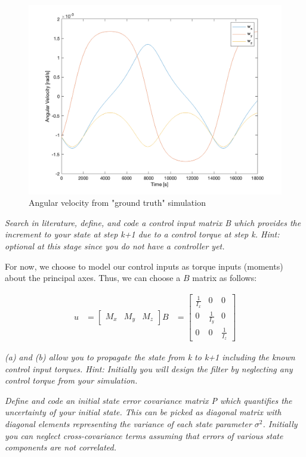 \begin{figure}[H]
\centering
\includegraphics[scale=0.6]{Images/ps7_problem5a_angvel_sim.png}
\caption{Angular velocity from "ground truth" simulation}
\label{fig:ps7_problem5a_angvel_sim}
\end{figure}

\textit{Search in literature, define, and code a control input matrix B which provides the increment to your state at step k+1 due to a control torque at step k. Hint: optional at this stage since you do not have a controller yet.}

For now, we choose to model our control inputs as torque inputs (moments) about the principal axes. Thus, we can choose a $B$ matrix as follows:

\begin{align*}
    u &= \begin{bmatrix}
        M_{x} & M_{y} & M_{z}
    \end{bmatrix}
    B &= \begin{bmatrix}
        \frac{1}{I_{x}} & 0 & 0 \\
        0 & \frac{1}{I_{y}} & 0 \\
        0 & 0 & \frac{1}{I_{z}}
    \end{bmatrix}
\end{align*}

\textit{(a) and (b) allow you to propagate the state from k to k+1 including the known control input torques. Hint: Initially you will design the filter by neglecting any control torque from your simulation.}

\textit{Define and code an initial state error covariance matrix P which quantifies the uncertainty of your initial state. This can be picked as diagonal matrix with diagonal elements representing the variance of each state parameter $\sigma^{2}$. Initially you can neglect cross-covariance terms assuming that errors of various state components are not correlated.}

